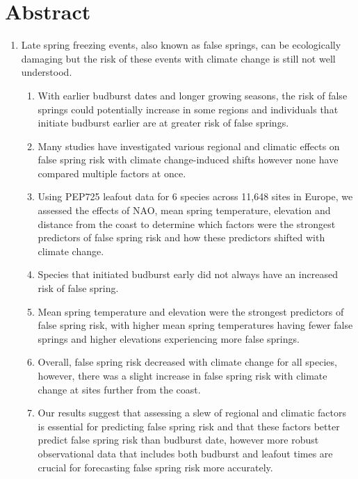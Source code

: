 \documentclass{article}\usepackage[]{graphicx}\usepackage[]{color}
\begin{document}
\section*{Abstract}
\begin{enumerate}
\item Late spring freezing events, also known as false springs, can be ecologically damaging but the risk of these events with climate change is still not well understood. 
  \begin{enumerate}
  \item With earlier budburst dates and longer growing seasons, the risk of false springs could potentially increase in some regions and individuals that initiate budburst earlier are at greater risk of false springs.
  \item Many studies have investigated various regional and climatic effects on false spring risk with climate change-induced shifts however none have compared multiple factors at once.
  \item Using PEP725 leafout data for 6 species across 11,648 sites in Europe, we assessed the effects of NAO, mean spring temperature, elevation and distance from the coast to determine which factors were the strongest predictors of false spring risk and how these predictors shifted with climate change. 
  \item Species that initiated budburst early did not always have an increased risk of false spring.
  \item Mean spring temperature and elevation were the strongest predictors of false spring risk, with higher mean spring temperatures having fewer false springs and higher elevations experiencing more false springs.
  \item Overall, false spring risk decreased with climate change for all species, however, there was a slight increase in false spring risk with climate change at sites further from the coast.
  \item Our results suggest that assessing a slew of regional and climatic factors is essential for predicting false spring risk and that these factors better predict false spring risk than budburst date, however more robust observational data that includes both budburst and leafout times are crucial for forecasting false spring risk more accurately.
  \end{enumerate}
\end{enumerate}
\end{document}
